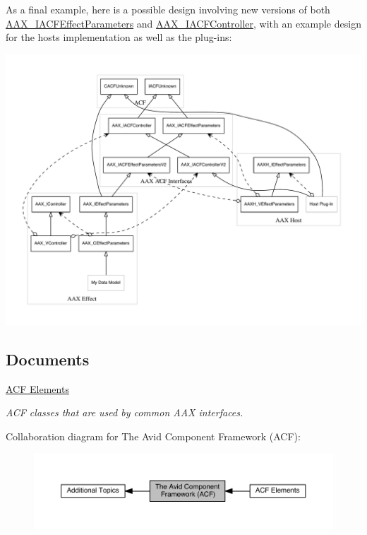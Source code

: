 As a final example, here is a possible design involving new versions of both \hyperlink{a00061}{A\+A\+X\+\_\+\+I\+A\+C\+F\+Effect\+Parameters} and \hyperlink{a00053}{A\+A\+X\+\_\+\+I\+A\+C\+F\+Controller}, with an example design for the host\textquotesingle{}s implementation as well as the plug-\/in\textquotesingle{}s\+:


\begin{DoxyImage}
\includegraphics[width=\textwidth,height=\textheight/2,keepaspectratio=true]{dot_aax_acf_versioning_full_v2}
\caption{Complete design example with versioned A\+C\+F interfaces}
\end{DoxyImage}
\subsection*{Documents}
\begin{DoxyCompactItemize}
\item 
\hyperlink{a00358}{A\+C\+F Elements}
\begin{DoxyCompactList}\small\item\em A\+C\+F classes that are used by common A\+A\+X interfaces. \end{DoxyCompactList}\end{DoxyCompactItemize}
Collaboration diagram for The Avid Component Framework (A\+C\+F)\+:
\nopagebreak
\begin{figure}[H]
\begin{center}
\leavevmode
\includegraphics[width=350pt]{a00357}
\end{center}
\end{figure}
